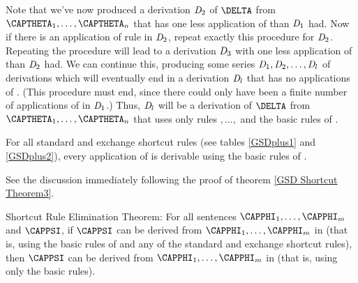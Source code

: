 \begin{PROOF}
Note that we've now produced a derivation $\mathit{D}_2$ of $\DELTA$ from $\CAPTHETA_1,\ldots,\CAPTHETA_{\integer{n}}$ that has one less application of  than $\mathit{D}_1$ had. 
Now if there is an application of rule  in $\mathit{D}_2$, repeat exactly this procedure for $\mathit{D}_2$. 
Repeating the procedure will lead to a derivation $\mathit{D}_3$ with one less application of  than $\mathit{D}_2$ had. 
We can continue this, producing some series $\mathit{D}_1,\mathit{D}_2,\ldots,\mathit{D}_{l}$ of derivations which will eventually end in a derivation $\mathit{D}_{l}$ that has no applications of . 
(This procedure must end, since there could only have been a finite number of applications of  in $\mathit{D}_1$.) 
Thus, $\mathit{D}_{l}$ will be a derivation of $\DELTA$ from $\CAPTHETA_1,\ldots,\CAPTHETA_{\integer{n}}$ that uses only rules $,\ldots,$ and the basic rules of \GSD{}.
\end{PROOF}
\begin{THEOREM}{}
For all standard and exchange shortcut rules  (see tables \ref{GSDplus1} and \ref{GSDplus2}), every application of  is derivable using the basic rules of \GSD{}.
\end{THEOREM}
\begin{PROOF}
See the discussion immediately following the proof of theorem \ref{GSD Shortcut Theorem3}.
\end{PROOF}
\begin{THEOREM}{ Shortcut Rule Elimination Theorem:}
For all \GSL{} sentences $\CAPPHI_1,\ldots,\CAPPHI_{\integer{m}}$ and $\CAPPSI$, if $\CAPPSI$ can be derived from $\CAPPHI_1,\ldots,\CAPPHI_{\integer{m}}$ in \GSDP{} (that is, using the basic rules of \GSD{} and any of the standard and exchange shortcut rules), then $\CAPPSI$ can be derived from $\CAPPHI_1,\ldots,\CAPPHI_{\integer{m}}$ in \GSD{} (that is, using only the basic rules).
\end{THEOREM}
